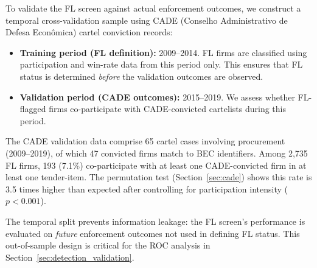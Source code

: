 To validate the FL screen against actual enforcement outcomes, we
construct a temporal cross-validation sample using CADE (Conselho
Administrativo de Defesa Econ\^omica) cartel conviction records:

\begin{itemize}
  \item \textbf{Training period (FL definition):} 2009--2014. FL firms
    are classified using participation and win-rate data from this
    period only. This ensures that FL status is determined
    \emph{before} the validation outcomes are observed.
  \item \textbf{Validation period (CADE outcomes):} 2015--2019. We
    assess whether FL-flagged firms co-participate with CADE-convicted
    cartelists during this period.
\end{itemize}

The CADE validation data comprise 65 cartel cases involving procurement
(2009--2019), of which 47 convicted firms match to BEC identifiers. Among
2,735 FL firms, 193 (7.1\%) co-participate with at least one
CADE-convicted firm in at least one tender-item. The permutation test
(Section~\ref{sec:cade}) shows this rate is 3.5 times higher than
expected after controlling for participation intensity ($p < 0.001$).

The temporal split prevents information leakage: the FL screen's
performance is evaluated on \emph{future} enforcement outcomes not used
in defining FL status. This out-of-sample design is critical for the
ROC analysis in Section~\ref{sec:detection_validation}.
